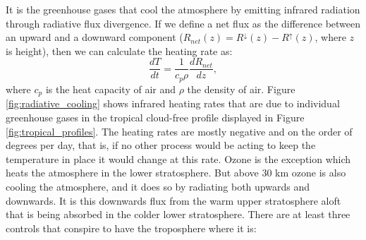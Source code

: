 \documentclass[12pt]{book}
\begin{document}
It is the greenhouse gases that cool the atmosphere by emitting infrared radiation through radiative flux divergence. If we define a net flux as the difference between an upward and a downward component ($R_{net}(z) = R^\downarrow(z) - R^\uparrow(z)$, where $z$ is height), then we can calculate the heating rate as:
\begin{equation}
\frac{dT}{dt} = \frac{1}{c_p \rho}\frac{dR_{net}}{dz},
\end{equation}
where $c_p$ is the heat capacity of air and $\rho$ the density of air. Figure \ref{fig:radiative_cooling} shows infrared heating rates that are due to individual greenhouse gases in the tropical cloud-free profile displayed in Figure \ref{fig:tropical_profiles}. The heating rates are mostly negative and on the order of degrees per day, that is, if no other process would be acting to keep the temperature in place it would change at this rate. Ozone is the exception which heats the atmosphere in the lower stratosphere. But above 30 km ozone is also cooling the atmosphere, and it does so by radiating both upwards and downwards. It is this downwards flux from the warm upper stratosphere aloft that is being absorbed in the colder lower stratosphere. There are at least three controls that conspire to have the troposphere where it is:
\end{document}
